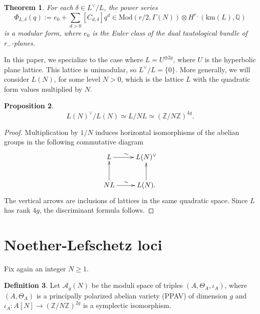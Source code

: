 \documentclass[12pt]{amsart}
\def\cA{\mathcal{A}}
\def\cM{\mathcal{M}}
\def\cO{\mathcal{O}}
\def\bQ{\mathbb{Q}}
\def\bZ{\mathbb{Z}}
\DeclareMathOperator{\ct}{ct}
\newcommand{\Mod}{\mathrm{Mod}}
\newcommand{\Tor}{{\mathsf{Tor}}}
\newcommand{\km}{\mathrm{km}}
\newtheorem{thm}{Theorem}[section]
\newtheorem{prop}[thm]{Proposition}
\theoremstyle{definition}
\newtheorem{defn}[thm]{Definition}
\newcommand{\NS}[1]{{\color{magenta}NS: #1}}
\begin{document}
\begin{thm} \cite{km}
    For each $\delta\in L^\vee/L$, the power series
    $$\Phi_{L,\delta}(q) := e_0+\sum_{d>0} [C_{d,\delta}] q^d \in \Mod(r/2, \Gamma(N))\otimes H^{r_-}(\km(L),\bQ)$$
is a modular form, where $e_0$ is the Euler class of the dual tautological bundle of $r_-$-planes.
\end{thm}
In this paper, we specialize to the case where $L = U^{\oplus 2g}$, where $U$ is the hyperbolic plane lattice. This lattice is unimodular, so $L^\vee/L = \{0\}$. More generally, we will consider $L(N)$, for some level $N>0$, which is the lattice $L$ with the quadratic form values multiplied by $N$.
\begin{prop}
    $$L(N)^\vee/ L(N) \simeq L/NL\simeq (\bZ/N\bZ)^{4g}.$$
\end{prop}
\begin{proof}
Multiplication by $1/N$ induces horizontal isomorphisms of the abelian groups in the following commutative diagram
$$\xymatrix{
L \ar[r]^{\sim\,\,\,} & L(N)^\vee \\
NL \ar[r]^{\sim\,\,\,} \ar[u] & L(N).\ar[u]
}$$
The vertical arrows are inclusions of lattices in the same quadratic space.
Since $L$ has rank $4g$, the discriminant formula follows.
\end{proof}


\section{Noether-Lefschetz loci}

Fix again an integer $N\ge1$.

\begin{defn}
    Let $\cA_g(N)$ be the moduli space of triples $(A,\Theta_A,\iota_A)$, where $(A,\Theta_A)$ is a principally polarized abelian variety (PPAV) of dimension $g$ and $\iota_A:A[N]\to (\bZ/N\bZ)^{2g}$ is a symplectic isomorphism.

\end{defn}
\end{document}

